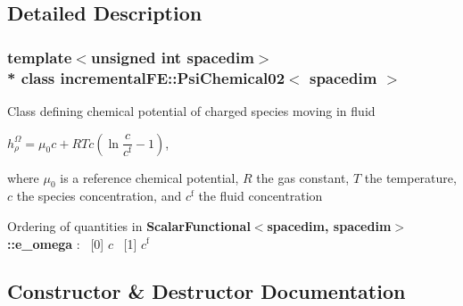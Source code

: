 \subsection{Detailed Description}
\subsubsection*{template$<$unsigned int spacedim$>$\\*
class incremental\+F\+E\+::\+Psi\+Chemical02$<$ spacedim $>$}

Class defining chemical potential of charged species moving in fluid

$h^\Omega_\rho = \mu_0 c + RT c \left( \ln\dfrac{c}{c^\mathrm{f}} - 1 \right)$,

where $\mu_0$ is a reference chemical potential, $R$ the gas constant, $T$ the temperature, $c$ the species concentration, and $c^\mathrm{f}$ the fluid concentration

Ordering of quantities in {\bf Scalar\+Functional$<$spacedim, spacedim$>$\+::e\+\_\+omega} \+:~\newline
 \mbox{[}0\mbox{]} $c$~\newline
 \mbox{[}1\mbox{]} $c^\mathrm{f}$ 

\subsection{Constructor \& Destructor Documentation}

